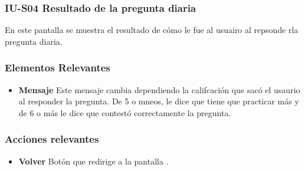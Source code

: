 
\subsubsection{IU-S04  Resultado de la pregunta diaria}

 En este pantalla se muestra el resultado de cómo le fue al usuairo al repsonde rla pregunta diaria.


\subsubsection{Elementos Relevantes}

    \begin{itemize}
    \item {\bf Mensaje}
        Este mensaje cambia dependiendo la
        califcación que sacó el usaurio al responder la pregunta. De 5 o mneos, le dice que tiene que practicar más y de 6 o más le dice que contestó correctamente la pregunta.
    \end{itemize}

\subsubsection{Acciones relevantes}

    \begin{itemize}
    \item {\bf Volver}
        Botón que redirige a la pantalla .
    \end{itemize}

\clearpage
